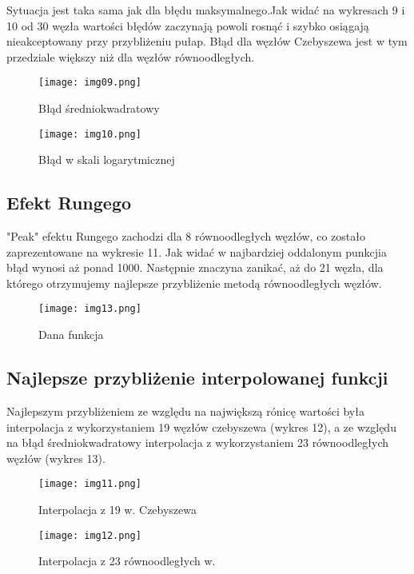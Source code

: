 \documentclass{article}
\begin{document}
Sytuacja jest taka sama jak dla błędu maksymalnego.Jak widać na wykresach 9 i 10 od 30 węzła wartości błędów zaczynają powoli rosnąć i szybko osiągają nieakceptowany przy przybliżeniu pułap. Błąd dla węzłów Czebyszewa jest w tym przedziale większy niż dla węzłów równoodległych.

\begin{figure}[H]
  \begin{minipage}[b]{0.49\textwidth}
    \texttt{[image: img09.png]}
    \caption{Błąd średniokwadratowy}
  \end{minipage}
  \hfill
  \begin{minipage}[b]{0.49\textwidth}
    \texttt{[image: img10.png]}
    \caption{Błąd w skali logarytmicznej}
  \end{minipage}
\end{figure}

\subsection{Efekt Rungego}

"Peak" efektu Rungego zachodzi dla 8 równoodległych węzłów, co zostało zaprezentowane na wykresie 11. Jak widać w najbardziej oddalonym punkcjia błąd wynosi aż ponad 1000. Następnie znaczyna zanikać, aż do 21 węzła, dla którego otrzymujemy najlepsze przybliżenie metodą równoodległych węzłów.

\begin{figure}[H]
  \centering
  \begin{minipage}[b]{0.93\textwidth}
    \texttt{[image: img13.png]}
    \caption{Dana funkcja}
  \end{minipage}
\end{figure}



\subsection{Najlepsze przybliżenie interpolowanej funkcji}

Najlepszym przybliżeniem ze względu na największą rónicę wartości była interpolacja z wykorzystaniem 19 węzłów czebyszewa (wykres 12), a ze względu na błąd średniokwadratowy interpolacja z wykorzystaniem 23 równoodległych węzłów (wykres 13).

\begin{figure}[H]
  \begin{minipage}[b]{0.49\textwidth}
    \texttt{[image: img11.png]}
    \caption{Interpolacja z 19 w. Czebyszewa}
  \end{minipage}
  \hfill
  \begin{minipage}[b]{0.49\textwidth}
    \texttt{[image: img12.png]}
    \caption{Interpolacja z 23 równoodległych w.}
  \end{minipage}
\end{figure}
\end{document}
